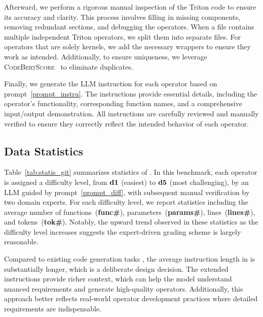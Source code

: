 Afterward, we perform a rigorous manual inspection of the Triton code to ensure its accuracy and clarity. 
This process involves filling in missing components, removing redundant sections, and debugging the operators.
When a file contains multiple independent Triton operators, we split them into separate files. For operators that are solely kernels, we add the necessary wrappers to ensure they work as intended. Additionally, to ensure uniqueness, we leverage \textsc{CodeBertScore}~\cite{codebertscore2023} to eliminate duplicates.

Finally, we generate the LLM instruction for each operator based on prompt~\ref{prompt_instru}. 
The instructions provide essential details, including the operator’s functionality, corresponding function names, and a comprehensive input/output demonstration. 
All instructions are carefully reviewed and manually verified to ensure they correctly reflect the intended behavior of each operator.


\subsection{Data Statistics}
\label{sec:benchone-datastatistic}
Table~\ref{tab:statis_git} summarizes statistics of \benchone. 
In this benchmark, each operator is assigned a difficulty level, from $\bf d1$ (easiest) to $\bf d5$ (most challenging), by an LLM guided by prompt~\ref{prompt_diff}, with subsequent manual verification by two domain experts. 
For each difficulty level, we report statistics including the average number of functions~(\textbf{func\#}), parameters~(\textbf{params\#}), lines~(\textbf{lines\#}), and tokens~(\textbf{tok\#}). 
Notably, the upward trend observed in these statistics as the difficulty level increases suggests the expert-driven grading scheme is largely reasonable. 

Compared to existing code generation tasks \cite{chen2021evaluating, austin2021program}, the average instruction length in \benchone is substantially longer, which is a deliberate design decision. 
The extended instructions provide richer context, which can help the model understand nuanced requirements and generate high-quality operators. 
Additionally, this approach better reflects real-world operator development practices where detailed requirements are indispensable. 



